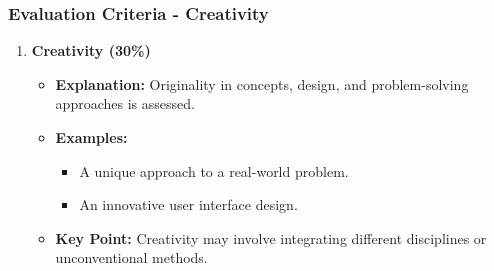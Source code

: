 \documentclass[aspectratio=169]{beamer}
\begin{document}
\begin{frame}[fragile]
    \frametitle{Evaluation Criteria - Creativity}
    \begin{enumerate}
        \item \textbf{Creativity (30\%)} 
            \begin{itemize}
                \item \textbf{Explanation:} Originality in concepts, design, and problem-solving approaches is assessed.
                \item \textbf{Examples:} 
                    \begin{itemize}
                        \item A unique approach to a real-world problem.
                        \item An innovative user interface design.
                    \end{itemize}
                \item \textbf{Key Point:} Creativity may involve integrating different disciplines or unconventional methods.
            \end{itemize}
    \end{enumerate}
\end{frame}
\end{document}
